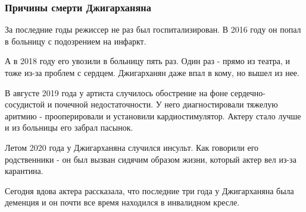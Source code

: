  
 
 

\subsubsection{Причины смерти Джигарханяна}

За последние годы режиссер не раз был госпитализирован. В 2016 году он
попал в больницу с подозрением на инфаркт.

А в 2018 году его увозили в больницу пять раз. Один раз - прямо из театра,
и тоже из-за проблем с сердцем. Джигарханян даже впал в кому, но вышел из
нее.

В августе 2019 года у артиста случилось обострение на фоне
сердечно-сосудистой и почечной недостаточности. У него диагностировали
тяжелую аритмию - прооперировали и установили кардиостимулятор. Актеру
стало лучше и из больницы его забрал пасынок.

Летом 2020 года у Джигарханяна случился инсульт. Как говорили его
родственники - он был вызван сидячим образом жизни, который актер вел
из-за карантина. 

Сегодня вдова актера рассказала, что последние три года у Джигарханяна
была деменция и он почти все время находился в инвалидном кресле. 

